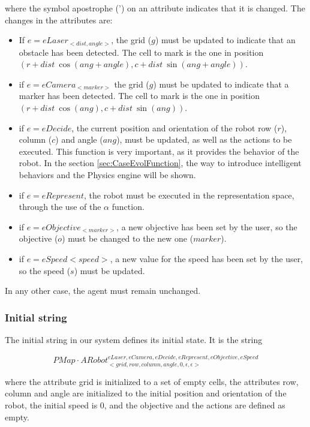 \documentclass{aamas2012}
\begin{document}
where the symbol apostrophe (') on an attribute indicates that it is changed. The changes in the attributes are:

\begin{itemize}
\item If $e=eLaser_{<dist,angle>}$, the grid ($g$) must be updated to indicate that an obstacle has been detected. The cell to mark is the one in position $(r+dist\ \cos(ang+angle), c+dist \ \sin(ang+angle))$.
\item if $e = eCamera_{<marker>}$ the grid ($g$) must be updated to indicate that a marker has been detected. The cell to mark is the one in position $(r+dist \ \cos(ang), c+dist \ \sin(ang))$.
\item if $e = eDecide$, the current position and orientation of the robot row ($r$), column ($c$) and angle ($ang$), must be updated, as well as the actions to be executed. This function is very important, as it provides the behavior of the robot. In the section \ref{sec:CaseEvolFunction}, the way to introduce intelligent behaviors and the Physics engine will be shown.
\item if $e = eRepresent$, the robot must be executed in the representation space, through the use of the $\alpha$ function.
\item if $e = eObjective_{<marker>}$, a new objective has been set by the user, so the objective ($o$) must be changed to the new one ($marker$).
\item if $e = eSpeed{<speed>}$, a new value for the speed has been set by the user, so the speed ($s$) must be updated.
\end{itemize}
In any other case, the agent must remain unchanged.

\subsubsection{Initial string}

The initial string in our system defines its initial state. It is the string 

\begin{small}
\begin{displaymath}
PMap \cdotp ARobot^{eLaser, eCamera, eDecide, eRepresent, eObjective, eSpeed}_{<grid, row, column, angle, 0, \epsilon, \epsilon>}
\end{displaymath}
\end{small}

 where the attribute grid is initialized to a set of empty cells, the attributes row, column and angle are initialized to the initial position and orientation of the robot, the initial speed is 0, and the objective and the actions are defined as empty.
\end{document}
